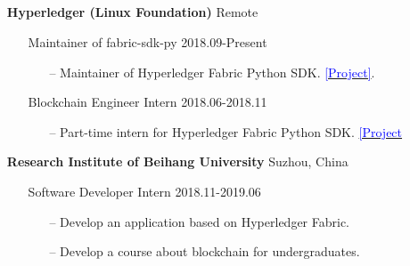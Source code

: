 \documentclass[11pt]{article}
\begin{document}
\subsection*{}
\begin{itemize}[leftmargin=0em]
    \setlength\itemsep{1em}
    \item[] \large\textbf{Hyperledger (Linux Foundation)} \hfill Remote
        \begin{itemize}[noitemsep, nolistsep, leftmargin=0em]
            \item[] Maintainer of fabric-sdk-py \hfill 2018.09-Present
             \begin{itemize}
                \small
                \item[--] Maintainer of Hyperledger Fabric Python SDK. \href{https://github.com/hyperledger/fabric-sdk-py}{\textcolor{blue}{[Project]}}.
             \end{itemize}
            \item[] Blockchain Engineer Intern \hfill 2018.06-2018.11
             \begin{itemize}
                \small
                \item[--] Part-time intern for Hyperledger Fabric Python SDK. \href{https://github.com/hyperledger/fabric-sdk-py}{\textcolor{blue}{[Project}}
             \end{itemize}
        \end{itemize} 
    \item[] \large\textbf{Research Institute of Beihang University} \hfill Suzhou, China
        \begin{itemize}[noitemsep, nolistsep, leftmargin=0em]
            \item[] Software Developer Intern \hfill 2018.11-2019.06
             \begin{itemize}
                \small
                \item[--] Develop an application based on Hyperledger Fabric.
                \item[--] Develop a course about blockchain for undergraduates.
             \end{itemize}
        \end{itemize} 
\end{itemize}
\end{document}
